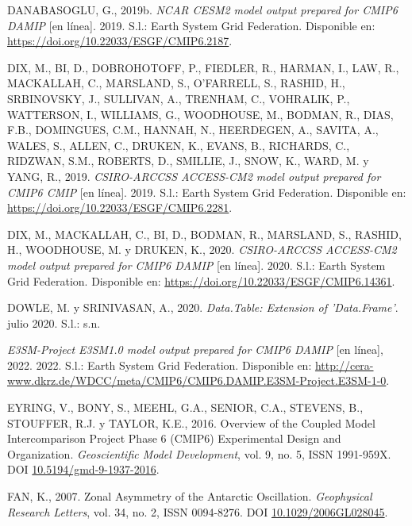 \documentclass[12pt,oneside,a4paper]{reedthesis}
\newlength{\cslhangindent}
\newenvironment{CSLReferences}[2] %
 {%
  \setlength{\parindent}{0pt}
  \ifodd #1 \everypar{\setlength{\hangindent}{\cslhangindent}}\ignorespaces\fi
  \ifnum #2 > 0
  \setlength{\parskip}{#2\baselineskip}
  \fi
 }%
 {}
\begin{document}
\begin{CSLReferences}{1}{0}
\leavevmode{}%
DANABASOGLU, G., 2019b. \emph{NCAR CESM2 model output prepared for CMIP6 DAMIP} {[}en línea{]}. 2019. S.l.: Earth System Grid Federation. Disponible en: \url{https://doi.org/10.22033/ESGF/CMIP6.2187}.

\leavevmode{}%
DIX, M., BI, D., DOBROHOTOFF, P., FIEDLER, R., HARMAN, I., LAW, R., MACKALLAH, C., MARSLAND, S., O'FARRELL, S., RASHID, H., SRBINOVSKY, J., SULLIVAN, A., TRENHAM, C., VOHRALIK, P., WATTERSON, I., WILLIAMS, G., WOODHOUSE, M., BODMAN, R., DIAS, F.B., DOMINGUES, C.M., HANNAH, N., HEERDEGEN, A., SAVITA, A., WALES, S., ALLEN, C., DRUKEN, K., EVANS, B., RICHARDS, C., RIDZWAN, S.M., ROBERTS, D., SMILLIE, J., SNOW, K., WARD, M. y YANG, R., 2019. \emph{CSIRO-ARCCSS ACCESS-CM2 model output prepared for CMIP6 CMIP} {[}en línea{]}. 2019. S.l.: Earth System Grid Federation. Disponible en: \url{https://doi.org/10.22033/ESGF/CMIP6.2281}.

\leavevmode{}%
DIX, M., MACKALLAH, C., BI, D., BODMAN, R., MARSLAND, S., RASHID, H., WOODHOUSE, M. y DRUKEN, K., 2020. \emph{CSIRO-ARCCSS ACCESS-CM2 model output prepared for CMIP6 DAMIP} {[}en línea{]}. 2020. S.l.: Earth System Grid Federation. Disponible en: \url{https://doi.org/10.22033/ESGF/CMIP6.14361}.

\leavevmode{}%
DOWLE, M. y SRINIVASAN, A., 2020. \emph{Data.Table: {Extension} of 'Data.Frame'}. julio 2020. S.l.: s.n.

\leavevmode{}%
\emph{E3SM-Project E3SM1.0 model output prepared for CMIP6 DAMIP} {[}en línea{]}, 2022. 2022. S.l.: Earth System Grid Federation. Disponible en: \url{http://cera-www.dkrz.de/WDCC/meta/CMIP6/CMIP6.DAMIP.E3SM-Project.E3SM-1-0}.

\leavevmode{}%
EYRING, V., BONY, S., MEEHL, G.A., SENIOR, C.A., STEVENS, B., STOUFFER, R.J. y TAYLOR, K.E., 2016. Overview of the {Coupled Model Intercomparison Project Phase} 6 ({CMIP6}) Experimental Design and Organization. \emph{Geoscientific Model Development}, vol. 9, no. 5, ISSN 1991-959X. DOI \href{https://doi.org/10.5194/gmd-9-1937-2016}{10.5194/gmd-9-1937-2016}.

\leavevmode{}%
FAN, K., 2007. Zonal Asymmetry of the {Antarctic Oscillation}. \emph{Geophysical Research Letters}, vol. 34, no. 2, ISSN 0094-8276. DOI \href{https://doi.org/10.1029/2006GL028045}{10.1029/2006GL028045}.


\end{CSLReferences}
\end{document}
